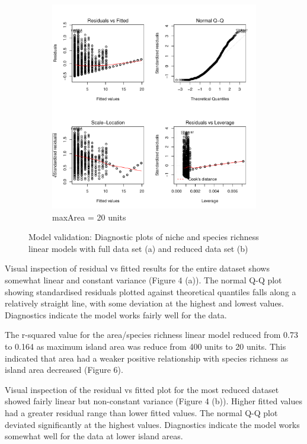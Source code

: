\documentclass{article}
\begin{document}
\begin{figure}[h!]
\begin{subfigure}[b]{0.4\linewidth}
    \includegraphics[width=\linewidth]{../../../Results/Simulation2/NicheSpeciesLmPlot_20.pdf}
    \caption{maxArea = 20 units}
  \end{subfigure}
  \caption{Model validation: Diagnostic plots of niche and species richness linear models with full data set (a) and reduced data set (b)}
  \label{fig:Model validation niche/species LM}
\end{figure}\bigskip

\noindent Visual inspection of residual vs fitted results for the entire dataset shows somewhat linear and constant variance (Figure 4 (a)). The normal Q-Q plot showing standardised residuals plotted against theoretical quantiles falls along a relatively straight line, with some deviation at the highest and lowest values. Diagnostics indicate the model works fairly well for the data.  \bigskip

\noindent The r-squared value for the area/species richness linear model reduced from 0.73 to 0.164 as maximum island area was reduce from 400 units to 20 units. This indicated that area had a weaker positive relationship with species richness as island area decreased (Figure 6). \bigskip

\noindent Visual inspection of the residual vs fitted plot for the most reduced dataset showed fairly linear but non-constant variance (Figure 4 (b)). Higher fitted values had a greater residual range than lower fitted values. The normal Q-Q plot deviated significantly at the highest values. Diagnostics indicate the model works somewhat well for the data at lower island areas. \bigskip
\end{document}
